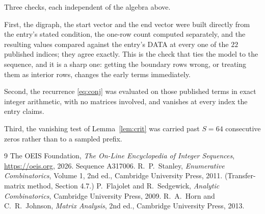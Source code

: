 \documentclass[11pt,a4paper]{article}
\theoremstyle{plain}
\theoremstyle{definition}
\begin{document}
Three checks, each independent of the algebra above.

First, the digraph, the start vector and the end vector were built directly from the
entry's stated condition, the one-row count computed separately, and the resulting values
compared against the entry's DATA at every one of the $22$ published indices; they
agree exactly. This is the check that ties the model to the sequence, and it is a sharp one:
getting the boundary rows wrong, or treating them as interior rows, changes the early terms
immediately.

Second, the recurrence \eqref{eq:conj} was evaluated on those published terms in exact
integer arithmetic, with no matrices involved, and vanishes at every index the entry claims.

Third, the vanishing test of Lemma~\ref{lem:crit} was carried past $S=64$ consecutive
zeros rather than to a sampled prefix.

\begin{thebibliography}{9}
 The OEIS Foundation, \emph{The On-Line Encyclopedia of Integer
Sequences}, \url{https://oeis.org}, 2026. Sequence A317006.
 R.~P.~Stanley, \emph{Enumerative Combinatorics}, Volume 1, 2nd ed.,
Cambridge University Press, 2011. (Transfer-matrix method, Section 4.7.)
 P.~Flajolet and R.~Sedgewick, \emph{Analytic Combinatorics}, Cambridge
University Press, 2009.
 R.~A.~Horn and C.~R.~Johnson, \emph{Matrix Analysis}, 2nd ed., Cambridge
University Press, 2013.
\end{thebibliography}
\end{document}

